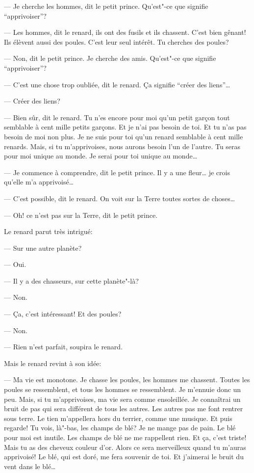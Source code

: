 \begin{Parallel}[p]{}{}
{--- Je cherche les hommes, dit le petit prince.
Qu'est"-ce que signifie ``apprivoiser''?

--- Les hommes, dit le renard, ils ont des fusils et
ils chassent. C'est bien gênant! Ils élèvent aussi des
poules. C'est leur seul intérêt. Tu cherches des
poules?

--- Non, dit le petit prince. Je cherche des amis.
Qu'est"-ce que signifie ``apprivoiser''?

--- C'est une chose trop oubliée, dit le renard. Ça
signifie ``créer des liens''\ldots{}

--- Créer des liens?

--- Bien sûr, dit le renard. Tu n'es encore pour
moi qu'un petit garçon tout semblable à cent mille
petits garçons. Et je n'ai pas besoin de toi. Et tu n'as
pas besoin de moi non plus. Je ne suis pour toi
qu'un renard semblable à cent mille renards. Mais,
si tu m'apprivoises, nous aurons besoin l'un de
l'autre. Tu seras pour moi unique au monde. Je serai
pour toi unique au monde\ldots{}

--- Je commence à comprendre, dit le petit
prince. Il y a une fleur\ldots{} je crois qu'elle m'a apprivoisé\ldots{}

--- C'est possible, dit le renard. On voit sur la
Terre toutes sortes de choses\ldots{}

--- Oh! ce n'est pas sur la Terre, dit le petit prince.

Le renard parut très intrigué:

--- Sur une autre planète?

--- Oui.

--- Il y a des chasseurs, sur cette planète"-là?

--- Non.

--- Ça, c'est intéressant! Et des poules?

--- Non.

--- Rien n'est parfait, soupira le renard.

Mais le renard revint à son idée:

--- Ma vie est monotone. Je chasse les poules, les
hommes me chassent. Toutes les poules se ressemblent, et tous les hommes se ressemblent. Je m'ennuie donc un peu. Mais, si tu m'apprivoises, ma vie
sera comme ensoleillée. Je connaîtrai un bruit de
pas qui sera différent de tous les autres. Les autres
pas me font rentrer sous terre. Le tien m'appellera
hors du terrier, comme une musique. Et puis
regarde! Tu vois, là"-bas, les champs de blé? Je ne
mange pas de pain. Le blé pour moi est inutile. Les
champs de blé ne me rappellent rien. Et ça, c'est
triste! Mais tu as des cheveux couleur d'or. Alors ce
sera merveilleux quand tu m'auras apprivoisé! Le
blé, qui est doré, me fera souvenir de toi. Et j'aimerai le bruit du vent dans le blé\ldots{}

}
\end{Parallel}
